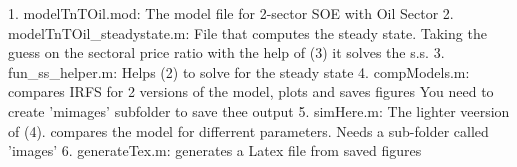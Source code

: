 1. modelTnTOil.mod: The model file for 2-sector SOE with Oil Sector
2. modelTnTOil_steadystate.m: File that computes the steady state. 
Taking the guess on the sectoral price ratio with the help of (3) 
it solves the s.s.
3. fun_ss_helper.m: Helps (2) to solve for the steady state
4. compModels.m: compares IRFS for 2 versions of the model, plots and saves figures
You need to create 'mimages' subfolder to save thee output
5. simHere.m: The lighter veersion of (4). compares the model for differrent parameters.
Needs a sub-folder called 'images'
6. generateTex.m: generates a Latex file from saved figures

